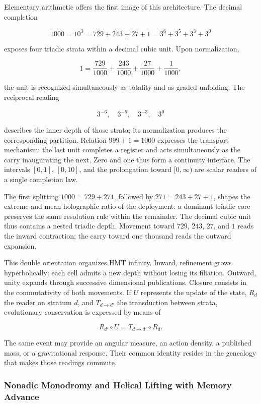 Elementary arithmetic offers the first image of this architecture. The decimal completion

\[
1000=10^3=729+243+27+1=3^6+3^5+3^3+3^0
\]

exposes four triadic strata within a decimal cubic unit. Upon normalization,

\[
1=\frac{729}{1000}+\frac{243}{1000}+\frac{27}{1000}+\frac{1}{1000},
\]

the unit is recognized simultaneously as totality and as graded unfolding. The reciprocal reading

\[
3^{-6},\quad 3^{-5},\quad 3^{-3},\quad 3^0
\]

describes the inner depth of those strata; its normalization produces the corresponding partition. Relation \(999+1=1000\) expresses the transport mechanism: the last unit completes a register and acts simultaneously as the carry inaugurating the next. Zero and one thus form a continuity interface. The intervals \([0,1]\), \([0,10]\), and the prolongation toward \([0,\infty)\) are scalar readers of a single completion law.

The first splitting \(1000=729+271\), followed by \(271=243+27+1\), shapes the extreme and mean holographic ratio of the deployment: a dominant triadic core preserves the same resolution rule within the remainder. The decimal cubic unit thus contains a nested triadic depth. Movement toward \(729\), \(243\), \(27\), and \(1\) reads the inward contraction; the carry toward one thousand reads the outward expansion.

This double orientation organizes HMT infinity. Inward, refinement grows hyperbolically: each cell admits a new depth without losing its filiation. Outward, unity expands through successive dimensional publications. Closure consists in the commutativity of both movements. If \(U\) represents the update of the state, \(R_d\) the reader on stratum \(d\), and \(T_{d\to d'}\) the transduction between strata, evolutionary conservation is expressed by means of

\[
R_{d'}\circ U
=
T_{d\to d'}\circ R_d.
\]

The same event may provide an angular measure, an action density, a published mass, or a gravitational response. Their common identity resides in the genealogy that makes those readings commute.

\subsubsection{Nonadic Monodromy and Helical Lifting with Memory Advance}

